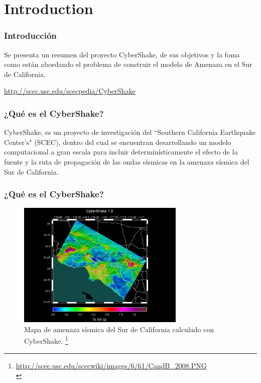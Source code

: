 \documentclass{beamer}
\begin{document}
\section{Introduction}
\begin{frame}
\frametitle{Introducción}
%
\justifying
Se presenta un resumen del proyecto {C}yber{S}hake, de sus objetivos y la foma como están abordando el problema de construir el modelo de Amenaza en el Sur de California.

\url{http://scec.usc.edu/scecpedia/CyberShake}
%
\end{frame}
%
%
\begin{frame}[allowframebreaks]
\frametitle{¿Qué es el CyberShake?}
%
\justifying
{C}yber{S}hake, es un proyecto de investigación del ``Southern California Earthquake Center's" (SCEC), dentro del cual se encuentran desarrollando un modelo computacional a gran escala para incluir determinísticamente el efecto de la fuente y la ruta de propagación de las ondas sísmicas en la amenaza sísmica del Sur de California.
%
\end{frame}
%
\begin{frame}
\frametitle{¿Qué es el CyberShake?}
\begin{figure}[h]
	\centering
	\includegraphics[height=6cm]{img/CyberShake_2009.pdf}
	\caption{Mapa de amenaza sísmica del Sur de California calculado con CyberShake. \footnote{\tiny \url{http://scec.usc.edu/scecwiki/images/6/61/CandB_2008.PNG}\\}}
\end{figure} 
%
\end{frame}
%
%
\end{document}

